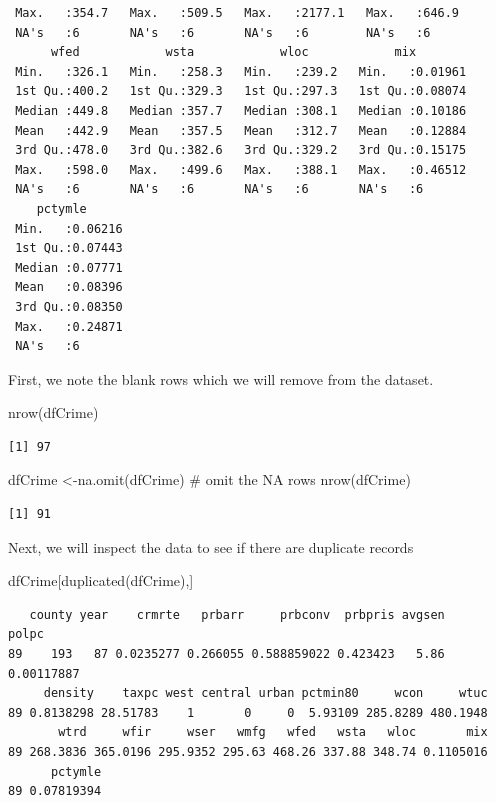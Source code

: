 \documentclass[]{article}
\newenvironment{Shaded}{}{}
\newcommand{\CommentTok}[1]{\textcolor[rgb]{0.00,0.50,0.00}{#1}}
\newcommand{\KeywordTok}[1]{\textcolor[rgb]{0.00,0.00,1.00}{#1}}
\newcommand{\NormalTok}[1]{#1}
\begin{document}
\begin{verbatim}
 Max.   :354.7   Max.   :509.5   Max.   :2177.1   Max.   :646.9  
 NA's   :6       NA's   :6       NA's   :6        NA's   :6      
      wfed            wsta            wloc            mix         
 Min.   :326.1   Min.   :258.3   Min.   :239.2   Min.   :0.01961  
 1st Qu.:400.2   1st Qu.:329.3   1st Qu.:297.3   1st Qu.:0.08074  
 Median :449.8   Median :357.7   Median :308.1   Median :0.10186  
 Mean   :442.9   Mean   :357.5   Mean   :312.7   Mean   :0.12884  
 3rd Qu.:478.0   3rd Qu.:382.6   3rd Qu.:329.2   3rd Qu.:0.15175  
 Max.   :598.0   Max.   :499.6   Max.   :388.1   Max.   :0.46512  
 NA's   :6       NA's   :6       NA's   :6       NA's   :6        
    pctymle       
 Min.   :0.06216  
 1st Qu.:0.07443  
 Median :0.07771  
 Mean   :0.08396  
 3rd Qu.:0.08350  
 Max.   :0.24871  
 NA's   :6        
\end{verbatim}

First, we note the blank rows which we will remove from the dataset.

\begin{Shaded}
\begin{Highlighting}[]
\KeywordTok{nrow}\NormalTok{(dfCrime)}
\end{Highlighting}
\end{Shaded}

\begin{verbatim}
[1] 97
\end{verbatim}

\begin{Shaded}
\begin{Highlighting}[]
\NormalTok{dfCrime <-}\KeywordTok{na.omit}\NormalTok{(dfCrime) }\CommentTok{# omit the NA rows}
\KeywordTok{nrow}\NormalTok{(dfCrime)}
\end{Highlighting}
\end{Shaded}

\begin{verbatim}
[1] 91
\end{verbatim}

Next, we will inspect the data to see if there are duplicate records

\begin{Shaded}
\begin{Highlighting}[]
\NormalTok{dfCrime[}\KeywordTok{duplicated}\NormalTok{(dfCrime),]}
\end{Highlighting}
\end{Shaded}

\begin{verbatim}
   county year    crmrte   prbarr     prbconv  prbpris avgsen      polpc
89    193   87 0.0235277 0.266055 0.588859022 0.423423   5.86 0.00117887
     density    taxpc west central urban pctmin80     wcon     wtuc
89 0.8138298 28.51783    1       0     0  5.93109 285.8289 480.1948
       wtrd     wfir     wser   wmfg   wfed   wsta   wloc       mix
89 268.3836 365.0196 295.9352 295.63 468.26 337.88 348.74 0.1105016
      pctymle
89 0.07819394
\end{verbatim}
\end{document}
